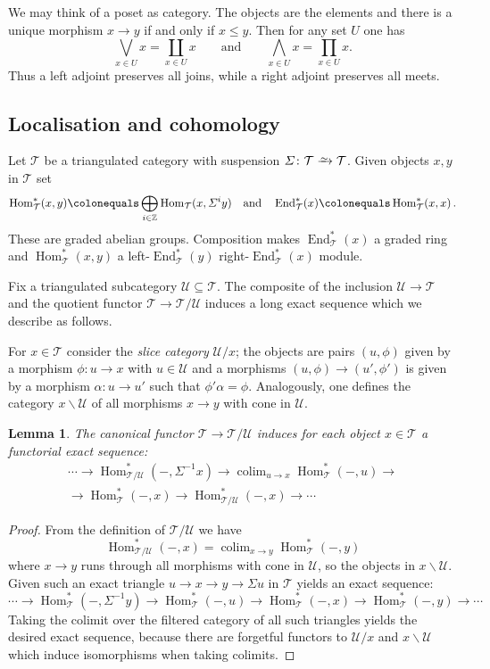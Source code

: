 \documentclass{amsart}[a4]
\newtheorem{lemma}[theorem]{Lemma}
\theoremstyle{definition}
\theoremstyle{remark}
\numberwithin{equation}{section}
\newcommand{\colim}{\operatorname{colim}}
\newcommand{\End}{\operatorname{End}}
\newcommand{\Hom}{\operatorname{Hom}}
\newcommand{\iso}{\xrightarrow{\raisebox{-.6ex}[0ex][0ex]{$\scriptstyle{\sim}$}}}
\newcommand{\lto}{\longrightarrow}
\newcommand{\cat}{\mathcal}
\newcommand{\bbZ}{\mathbb Z}
\newcommand{\Si}{\Sigma}
\let\Sigma\varSigma
\begin{document}
We may think of a poset as category. The objects are the elements and
there is a unique morphism $x\to y$ if and only if $x\le y$. Then for
any set $U$ one has
\[\bigvee_{x\in U}x =\coprod_{x\in
    U}x\qquad\text{and}\qquad\bigwedge_{x\in U}x =\prod_{x\in U}x.\]
Thus a left adjoint preserves all joins, while a right adjoint
preserves all meets.


\subsection*{Localisation and cohomology}

Let $\cat T$ be a triangulated category with suspension
$\Si\colon\cat T\iso\cat T$. Given objects $x,y$ in $\cat T$ set
\[ \Hom_{\cat T}^*(x,y)\colonequals \bigoplus_{i\in\bbZ}\Hom_{\cat
T}(x,\Si^i y) \quad \text{and}\quad
\End_{\cat T}^{*}(x)\colonequals \Hom_{\cat T}^{*}(x,x)\,.
\] These are graded abelian groups. Composition makes $\End_{\cat
T}^{*}(x)$ a graded ring and $\Hom_{\cat T}^{*}(x,y)$ a
left-$\End_{\cat T}^{*}(y)$ right-$\End_{\cat T}^{*}(x)$ module.

Fix a triangulated subcategory $\cat U\subseteq\cat T$. The composite
of the inclusion $\cat U\to \cat T$ and the quotient functor
$\cat T\to\cat T/\cat U$ induces a long exact sequence which we
describe as follows.

For $x\in\cat T$ consider the \emph{slice category} $\cat U/x$; the
objects are pairs $(u,\phi)$ given by a morphism $\phi\colon u\to x$
with $u\in\cat U$ and a morphisms $(u,\phi)\to (u',\phi')$ is given by
a morphism $\alpha\colon u\to u'$ such that
$\phi'\alpha=\phi$. Analogously, one defines the category
$x\backslash\cat U$ of all morphisms $x\to y$ with cone in $\cat U$.

\begin{lemma}\label{le:loc-long} 
The canonical functor $\cat T\to\cat T/\cat U$ induces for each object
$x\in\cat T$ a functorial exact sequence:
\begin{multline*}
\cdots\lto \Hom^*_{\cat T/\cat U}(-,\Si^{-1}x)\lto \colim_{u\to
  x}\Hom^*_\cat T(-,u)\lto \\ \lto\Hom^*_\cat T(-,x)\lto
\Hom^*_{\cat T/\cat U}(-,x)\lto \cdots
\end{multline*}
\end{lemma}
\begin{proof}
  From the definition of $\cat T/\cat U$ we have
\[
\Hom^*_{\cat T/\cat U}(-,x)=\colim_{x\to y}\Hom^*_\cat T(-,y)
\]
where $x\to y$ runs through all morphisms with cone in $\cat U$, so
the objects in $x\backslash\cat U$.  Given such an exact triangle
$u\to x\to y\to\Si u$ in $\cat T$ yields an exact sequence:
\[
\cdots\to \Hom^*_{\cat T}(-,\Si^{-1}y)\to \Hom^*_\cat T(-,u)\to\Hom^*_\cat T(-,x)\to
\Hom^*_{\cat T}(-,y)\to \cdots
\]
Taking the colimit over the filtered category of all such
triangles yields the desired exact sequence, because there are
forgetful functors to $\cat U/x$ and $x\backslash\cat U$ which induce
isomorphisms when taking colimits.
\end{proof}
\end{document}
